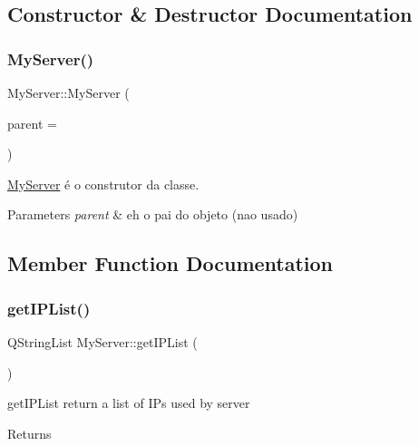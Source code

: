\subsection{Constructor \& Destructor Documentation}
\mbox{\label{class_my_server_ac9e5ca7b551a5df90d5b39260f7e5404}} 
\subsubsection{\texorpdfstring{My\+Server()}{MyServer()}}
{\footnotesize\ttfamily My\+Server\+::\+My\+Server (\begin{DoxyParamCaption}\item[{Q\+Object $\ast$}]{parent = {} }\end{DoxyParamCaption})}



\mbox{\hyperlink{class_my_server}{My\+Server}} é o construtor da classe. 


\begin{DoxyParams}{Parameters}
{\em parent} & eh o pai do objeto (nao usado) \\
\hline
\end{DoxyParams}


\subsection{Member Function Documentation}
\mbox{\label{class_my_server_ac10d498dcc2b5d691f131f17b6602a59}} 
\subsubsection{\texorpdfstring{get\+I\+P\+List()}{getIPList()}}
{\footnotesize\ttfamily Q\+String\+List My\+Server\+::get\+I\+P\+List (\begin{DoxyParamCaption}{ }\end{DoxyParamCaption})}



get\+I\+P\+List return a list of I\+Ps used by server 

\begin{DoxyReturn}{Returns}

\end{DoxyReturn}
\mbox{\label{class_my_server_a635c7a1e6817285ffb1a2a3842df010b}} 
